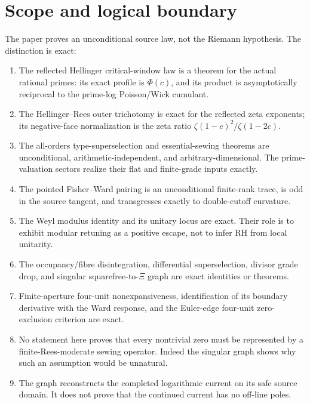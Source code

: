\documentclass[11pt]{article}
\theoremstyle{definition}
\theoremstyle{remark}
\begin{document}
\section{Scope and logical boundary}\label{sec:scope}

The paper proves an unconditional source law, not the Riemann hypothesis.  The distinction is
exact:

\begin{enumerate}[label=\textup{(\arabic*)}]
\item The reflected Hellinger critical-window law is a theorem for the actual rational primes:
its exact profile is \(\Phi(c)\), and its product is asymptotically reciprocal to the
prime-log Poisson/Wick cumulant.
\item The Hellinger--Rees outer trichotomy is exact for the reflected zeta exponents; its
negative-face normalization is the zeta ratio
\(\zeta(1-c)^2/\zeta(1-2c)\).
\item The all-orders type-superselection and essential-sewing theorems are unconditional,
arithmetic-independent, and arbitrary-dimensional.  The prime-valuation sectors realize their
flat and finite-grade inputs exactly.
\item The pointed Fisher--Ward pairing is an unconditional finite-rank trace, is odd in the
source tangent, and transgresses exactly to double-cutoff curvature.
\item The Weyl modulus identity and its unitary locus are exact.  Their role is to exhibit
modular retuning as a positive escape, not to infer RH from local unitarity.
\item The occupancy/fibre disintegration, differential superselection, divisor grade drop, and
singular squarefree-to-\(\Xi\) graph are exact identities or theorems.
\item Finite-aperture four-unit nonexpansiveness, identification of its boundary derivative with
the Ward response, and the Euler-edge four-unit zero-exclusion criterion are exact.
\item No statement here proves that every nontrivial zero must be represented by a
finite-Rees-moderate sewing operator.  Indeed the singular graph shows why such an assumption
would be unnatural.
\item The graph reconstructs the completed logarithmic current on its safe source domain.  It
does not prove that the continued current has no off-line poles.
\end{enumerate}
\end{document}
